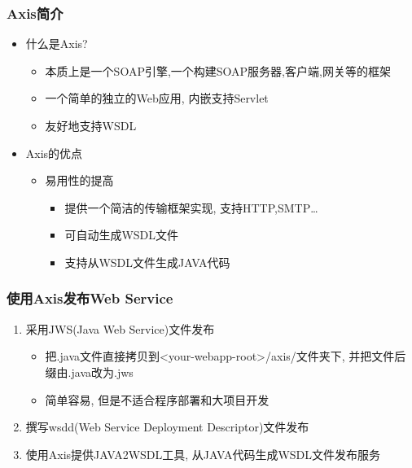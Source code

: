 \documentclass[CJKutf8,compress,hyperref]{beamer}
\begin{document}
\begin{CJK}{UTF8}{song}
        \begin{frame} 
                \frametitle{ Axis简介}
                \begin{itemize}
                        \item 什么是Axis?\cite{AxisIntroduction}
                                \begin{itemize}
                                        \item 本质上是一个SOAP引擎,一个构建SOAP服务器,客户端,网关等的框架
                                        \item 一个简单的独立的Web应用, 内嵌支持Servlet
                                        \item 友好地支持WSDL
                                \end{itemize}
                        \item Axis的优点
                                \begin{itemize}
                                        \item 易用性的提高
                                                \begin{itemize}
                                                        \item 提供一个简洁的传输框架实现, 支持HTTP,SMTP\ldots
                                                        \item 可自动生成WSDL文件
                                                        \item 支持从WSDL文件生成JAVA代码
                                                \end{itemize}
                                \end{itemize}
                \end{itemize}
        \end{frame}

        \begin{frame}
                \frametitle{ 使用Axis发布Web Service}
                \begin{enumerate}
                        \item 采用JWS(Java Web Service)文件发布
                                \begin{itemize}
                                        \item 把{\color{red}.java}文件直接拷贝到{\color{red}<your-webapp-root>/axis/}文件夹下, 并把文件后缀由{\color{red}.java}改为{\color{red}.jws}
                                        \item 简单容易, {\color{red}但是不适合程序部署和大项目开发}
                                \end{itemize}
                        \item 撰写wsdd(Web Service Deployment Descriptor)文件发布
                        \item 使用Axis提供JAVA2WSDL工具, 从JAVA代码生成WSDL文件发布服务\cite{JAVA2WSDL}
                \end{enumerate}
        \end{frame}


\end{CJK}
\end{document}
